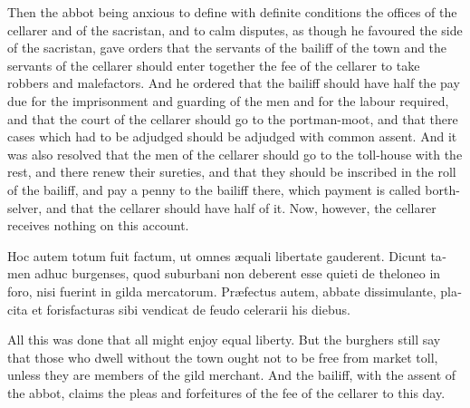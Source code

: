 \documentclass[10pt]{book}
\begin{document}
\begin{paracol}{2}
\switchcolumn

Then the abbot being anxious to define with definite conditions the offices of the cellarer and of the sacristan, and to calm disputes, as though he favoured the side of the sacristan, gave orders that the servants of the bailiff of the town and the servants of the cellarer should enter together the fee of the cellarer to take robbers and malefactors. And he ordered that the bailiff should have half the pay due for the imprisonment and guarding of the men and for the labour required, and that the court of the cellarer should go to the portman-moot, and that there cases which had to be adjudged should be adjudged with common assent. And it was also resolved that the men of the cellarer should go to the toll-house with the rest, and there renew their sureties, and that they should be inscribed in the roll of the bailiff, and pay a penny to the bailiff there, which payment is called borth-selver, and that the cellarer should have half of it. Now, however, the cellarer receives nothing on this account.

\switchcolumn*

\begin{otherlanguage}{latin}
Hoc autem totum fuit factum, ut omnes \ae{}quali libertate gauderent. Dicunt tamen adhuc burgenses, quod suburbani non deberent esse quieti de theloneo in foro, nisi fuerint in gilda mercatorum. Pr\ae{}fectus autem, abbate dissimulante, placita et forisfacturas sibi vendicat de feudo celerarii his diebus.
\end{otherlanguage}

\switchcolumn

All this was done that all might enjoy equal liberty. But the burghers still say that those who dwell without the town ought not to be free from market toll, unless they are members of the gild merchant. And the bailiff, with the assent of the abbot, claims the pleas and forfeitures of the fee of the cellarer to this day.

\switchcolumn*


\end{paracol}
\end{document}
